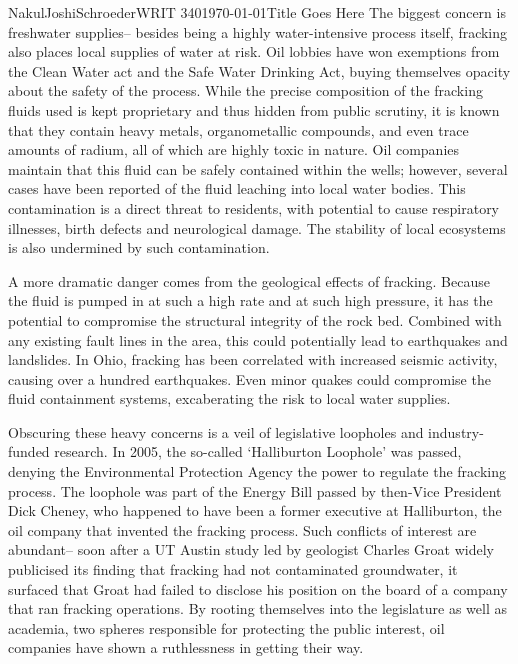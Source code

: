 \documentclass[12pt,letterpaper]{article}
\begin{document}
\begin{mla}{Nakul}{Joshi}{Schroeder}{WRIT 340}{\today}{Title Goes Here}
The biggest concern is freshwater supplies-- besides being a highly water-intensive process itself, fracking also places local supplies of water at risk. Oil lobbies have won exemptions from the Clean Water act and the Safe Water Drinking Act, buying themselves opacity about the safety of the process. While the precise composition of the fracking fluids used is kept proprietary and thus hidden from public scrutiny, it is known that they contain heavy metals, organometallic compounds, and even trace amounts of radium, all of which are highly toxic in nature. Oil companies maintain that this fluid can be safely contained within the wells; however, several cases have been reported of the fluid leaching into local water bodies. This contamination is a direct threat to residents, with potential to cause respiratory illnesses, birth defects and neurological damage. The stability of local ecosystems is also undermined by such contamination. 

A more dramatic danger comes from the geological effects of fracking. Because the fluid is pumped in at such a high rate and at such high pressure, it has the potential to compromise the structural integrity of the rock bed. Combined with any existing fault lines in the area, this could potentially lead to earthquakes and landslides. In Ohio, fracking has been correlated with increased seismic activity, causing over a hundred earthquakes. Even minor quakes could compromise the fluid containment systems, excaberating the risk to local water supplies.

Obscuring these heavy concerns is a veil of legislative loopholes and industry-funded research. In 2005, the so-called `Halliburton Loophole' was passed, denying the Environmental Protection Agency the power to regulate the fracking process. The loophole was part of the Energy Bill passed by then-Vice President Dick Cheney, who happened to have been a former executive at Halliburton, the oil company that invented the fracking process. Such conflicts of interest are abundant-- soon after a UT Austin study led by geologist Charles Groat widely publicised its finding that fracking had not contaminated groundwater, it surfaced that Groat had failed to disclose his position on the board of a company that ran fracking operations. By rooting themselves into the legislature as well as academia, two spheres responsible for protecting the public interest, oil companies have shown a ruthlessness in getting their way.





\end{mla}
\end{document}
